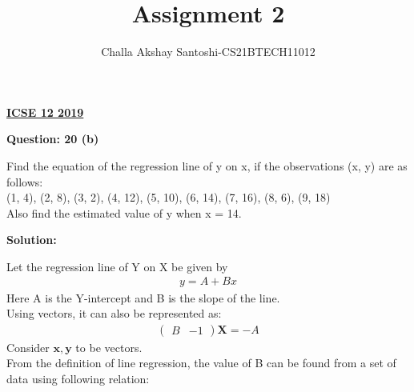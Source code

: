 \documentclass[journal,12pt,twocolumn]{IEEEtran}
\begin{document}
\newcommand{\myvec}[1]{\ensuremath{\begin{pmatrix}#1\end{pmatrix}}}
\newcommand{\mydet}[1]{\ensuremath{\begin{vmatrix}#1\end{vmatrix}}}
\makeatletter
{}
\makeatother
\let\StandardTheFigure\thefigure
\let\vec\mathbf
\renewcommand{\thefigure}{\theproblem}
\def\putbox#1#2#3{\makebox[0in][l]{\makebox[#1][l]{}\raisebox{\baselineskip}[0in][0in]{\raisebox{#2}[0in][0in]{#3}}}}
     \def\rightbox#1{\makebox[0in][r]{#1}}
     \def\centbox#1{\makebox[0in]{#1}}
     \def\topbox#1{\raisebox{-\baselineskip}[0in][0in]{#1}}
     \def\midbox#1{\raisebox{-0.5\baselineskip}[0in][0in]{#1}}
\vspace{3cm}
\title{Assignment 2}
\author{Challa Akshay Santoshi-CS21BTECH11012}
\maketitle
\newpage
\bigskip
\renewcommand{\thefigure}{\theenumi}
\renewcommand{\thetable}{\theenumi}
\begin{center}
  \textbf{\underline{ICSE 12 2019}}\\
\end{center}
\begin{center}
  \textbf{Question: 20 (b)}  
\end{center}
Find the equation of the regression line of y on x, if the observations (x, y) are as follows:\\
(1, 4), (2, 8), (3, 2), (4, 12), (5, 10), (6, 14), (7, 16), (8, 6), (9, 18)\\
Also find the estimated value of y when x = 14.\\
\begin{center}
  \textbf{Solution:}  
\end{center}
Let the regression line of Y on X be given by
\begin{align}
    y = A + Bx
\end{align}
Here A is the Y-intercept and B is the slope of the line.\\
Using vectors, it can also be represented as:
\begin{align}
    \myvec{B & -1}\vec{X} = -A
\end{align}
Consider $\vec{x}, \vec{y}$ to be vectors.\\
From the definition of line regression, the value of B can be found from a set of data using following relation:\\
\end{document}
